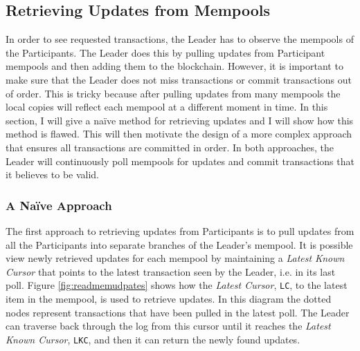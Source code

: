 \documentclass[12pt,a4paper,twoside,openright]{report}
\begin{document}
	\subsection{Retrieving Updates from Mempools}
	In order to see requested transactions, the Leader has to observe the mempools of the Participants. 
	The Leader does this by pulling updates from Participant mempools and then adding them to the blockchain.
	However, it is important to make sure that the Leader does not miss transactions or commit transactions out of order.
	This is tricky because after pulling updates from many mempools the local copies will reflect each mempool at a different moment in time.
	In this section, I will give a na\"{i}ve method for retrieving updates and I will show how this method is flawed. 
	This will then motivate the design of a more complex approach that ensures all transactions are committed in order.
	In both approaches, the Leader will continuously poll mempools for updates and commit transactions that it believes to be valid. \\
	
	\subsubsection*{A Na\"{i}ve Approach}
	The first approach to retrieving updates from Participants is to pull updates from all the Participants into separate branches of the Leader's mempool.
	It is possible view newly retrieved updates for each mempool by maintaining a \textit{Latest Known Cursor} that points to the latest transaction seen by the Leader, i.e. in its last poll.
	Figure \ref{fig:readmemudpates} shows how the \textit{Latest Cursor}, \texttt{LC}, to the latest item in the mempool, is used to retrieve updates.
	In this diagram the dotted nodes represent transactions that have been pulled in the latest poll.
	The Leader can traverse back through the log from this cursor until it reaches the \textit{Latest Known Cursor}, \texttt{LKC}, and then it can return the newly found updates.\\
\end{document}
